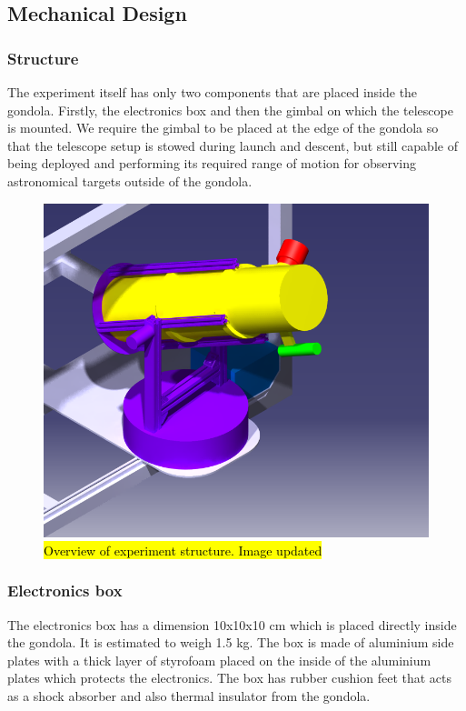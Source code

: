 \newpage
\subsection{Mechanical Design} \label{Mechanical_Design}
\label{sec:mechanical-design}

\subsubsection{Structure}
\label{sec:4.4.1}
The experiment itself has only two components that are placed inside the gondola. Firstly, the electronics box and then the gimbal on which the telescope is mounted. We require the gimbal to be placed at the edge of the gondola so that the telescope setup is stowed during launch and descent, but still capable of being deployed and performing its required range of motion for observing astronomical targets outside of the gondola.

\begin{figure}[H]
    \centering
	\includegraphics[scale=1.2]{4-experiment-design/img/mechanical/Assembly_v3iso.png}
	\caption{\hl{Overview of experiment structure. Image updated}}
\end{figure}
\subsubsection{Electronics box}
\label{sec:4.4.2}
The electronics box has a dimension 10x10x10 cm which is placed directly inside the gondola. It is estimated to weigh 1.5 kg. The box is made of aluminium side plates with a thick layer of styrofoam placed on the inside of the aluminium plates which protects the electronics. The box has rubber cushion feet that acts as a shock absorber and also thermal insulator from the gondola.

